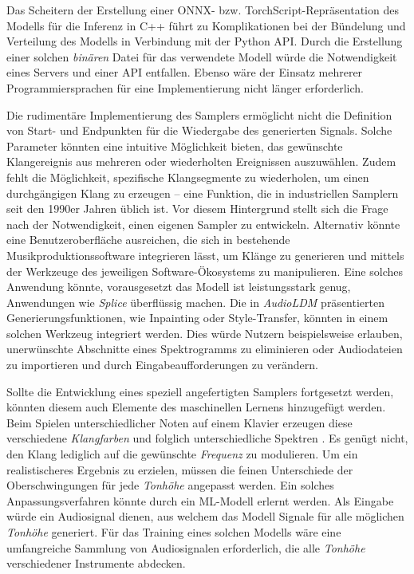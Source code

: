 \documentclass[
  a4paper,  %
  twoside,  %
  bibliography=totoc,
  headsepline,
  cleardoublepage=empty,
  parskip=half,
  draft=false
]{scrbook}
\begin{document}
{Das Scheitern der Erstellung einer ONNX- bzw. TorchScript-Repräsentation des Modells für die Inferenz in C++ führt zu Komplikationen bei der Bündelung und Verteilung des Modells in Verbindung mit der Python API. Durch die Erstellung einer solchen \emph{binären} Datei für das verwendete Modell würde die Notwendigkeit eines Servers und einer API entfallen. Ebenso wäre der Einsatz mehrerer Programmiersprachen für eine Implementierung nicht länger erforderlich.

Die rudimentäre Implementierung des Samplers ermöglicht nicht die Definition von Start- und Endpunkten für die Wiedergabe des generierten Signals. Solche Parameter könnten eine intuitive Möglichkeit bieten, das gewünschte Klangereignis aus mehreren oder wiederholten Ereignissen auszuwählen. Zudem fehlt die Möglichkeit, spezifische Klangsegmente zu wiederholen, um einen durchgängigen Klang zu erzeugen – eine Funktion, die in industriellen Samplern seit den 1990er Jahren üblich ist. Vor diesem Hintergrund stellt sich die Frage nach der Notwendigkeit, einen eigenen Sampler zu entwickeln. Alternativ könnte eine Benutzeroberfläche ausreichen, die sich in bestehende Musikproduktionssoftware integrieren lässt, um Klänge zu generieren und mittels der Werkzeuge des jeweiligen Software-Ökosystems zu manipulieren. Eine solches Anwendung könnte, vorausgesetzt das Modell ist leistungsstark genug, Anwendungen wie \emph{Splice} \cite{noauthor_royalty-free_nodate} überflüssig machen. Die in \emph{AudioLDM} \cite{liu_audioldm_2023} präsentierten Generierungsfunktionen, wie Inpainting oder Style-Transfer, könnten in einem solchen Werkzeug integriert werden. Dies würde Nutzern beispielsweise erlauben, unerwünschte Abschnitte eines Spektrogramms zu eliminieren oder Audiodateien zu importieren und durch Eingabeaufforderungen zu verändern.

Sollte die Entwicklung eines speziell angefertigten Samplers fortgesetzt werden, könnten diesem auch Elemente des maschinellen Lernens hinzugefügt werden. Beim Spielen unterschiedlicher Noten auf einem Klavier erzeugen diese verschiedene \emph{Klangfarben} und folglich unterschiedliche Spektren \cite{parker_good_2009}. Es genügt nicht, den Klang lediglich auf die gewünschte \emph{Frequenz} zu modulieren. Um ein realistischeres Ergebnis zu erzielen, müssen die feinen Unterschiede der Oberschwingungen für jede \emph{Tonhöhe} angepasst werden. Ein solches Anpassungsverfahren könnte durch ein ML-Modell erlernt werden. Als Eingabe würde ein Audiosignal dienen, aus welchem das Modell Signale für alle möglichen \emph{Tonhöhe} generiert. Für das Training eines solchen Modells wäre eine umfangreiche Sammlung von Audiosignalen erforderlich, die alle \emph{Tonhöhe} verschiedener Instrumente abdecken.

}
\end{document}

